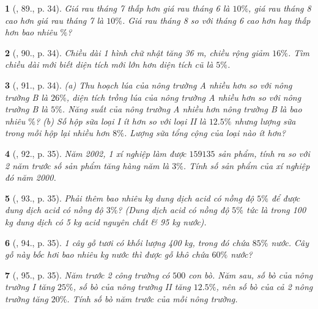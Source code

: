 \documentclass{article}
\newtheorem{baitoan}{}
\begin{document}
\begin{baitoan}[\cite{Binh_Toan_6_tap_2}, 89., p. 34]
	Giá rau tháng 7 thấp hơn giá rau tháng 6 là $10\%$, giá rau tháng 8 cao hơn giá rau tháng 7 là $10\%$. Giá rau tháng 8 so với tháng 6 cao hơn hay thấp hơn bao nhiêu $\%$?
\end{baitoan}

\begin{baitoan}[\cite{Binh_Toan_6_tap_2}, 90., p. 34]
	Chiều dài 1 hình chữ nhật tăng {\rm36 m}, chiều rộng giảm $16\%$. Tìm chiều dài mới biết diện tích mới lớn hơn diện tích cũ là $5\%$.
\end{baitoan}

\begin{baitoan}[\cite{Binh_Toan_6_tap_2}, 91., p. 34]
	(a) Thu hoạch lúa của nông trường A nhiều hơn so với nông trường B là $26\%$, diện tích trồng lúa của nông trường A nhiều hơn so với nông trường B là $5\%$. Năng suất của nông trường A nhiều hơn nông trường B là bao nhiêu $\%$? (b) Số hộp sữa loại I ít hơn so với loại II là $12.5\%$ nhưng lượng sữa trong mỗi hộp lại nhiều hơn $8\%$. Lượng sữa tổng cộng của loại nào ít hơn?
\end{baitoan}

\begin{baitoan}[\cite{Binh_Toan_6_tap_2}, 92., p. 35]
	Năm 2002, 1 xí nghiệp làm được $159135$ sản phẩm, tính ra so với 2 năm trước số sản phẩm tăng hàng năm là $3\%$. Tính số sản phẩm của xí nghiệp đó năm 2000.
\end{baitoan}

\begin{baitoan}[\cite{Binh_Toan_6_tap_2}, 93., p. 35]
	Phải thêm bao nhiêu {\rm kg} dung dịch acid có nồng độ $5\%$ để được dung dịch acid có nồng độ $3\%$? (Dung dịch acid có nồng độ $5\%$ tức là trong {\rm100 kg} dung dịch có {\rm5 kg} acid nguyên chất \& {\rm95 kg} nước).
\end{baitoan}

\begin{baitoan}[\cite{Binh_Toan_6_tap_2}, 94., p. 35]
	1 cây gỗ tươi có khối lượng {\rm400 kg}, trong đó chứa $85\%$ nước. Cây gỗ này bốc hơi bao nhiêu {\rm kg} nước thì được gỗ khô chứa $60\%$ nước?
\end{baitoan}

\begin{baitoan}[\cite{Binh_Toan_6_tap_2}, 95., p. 35]
	Năm trước 2 công trường có $500$ con bò. Năm sau, số bò của nông trường I tăng $25\%$, số bò của nông trường II tăng $12.5\%$, nên số bò của cả 2 nông trường tăng $20\%$. Tính số bò năm trước của mỗi nông trường.
\end{baitoan}
\end{document}
